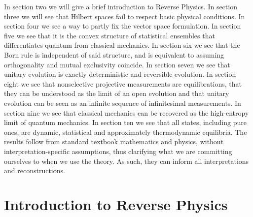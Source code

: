 \documentclass[entropy,article,submit,moreauthors]{Definitions/mdpi}
\begin{document}
In section two we will give a brief introduction to Reverse Physics. In section three we will see that Hilbert spaces fail to respect basic physical conditions. In section four we see a way to partly fix the vector space formulation. In section five we see that it is the convex structure of statistical ensembles that differentiates quantum from classical mechanics. In section six we see that the Born rule is independent of said structure, and is equivalent to assuming orthogonality and mutual exclusivity coincide. In section seven we see that unitary evolution is exactly deterministic and reversible evolution. In section eight we see that nonselective projective measurements are equilibrations, that they can be understood as the limit of an open evolution and that unitary evolution can be seen as an infinite sequence of infinitesimal measurements. In section nine we see that classical mechanics can be recovered as the high-entropy limit of quantum mechanics. In section ten we see that all states, including pure ones, are dynamic, statistical and approximately thermodynamic equilibria. The results follow from standard textbook mathematics and physics, without interpretation-specific assumptions, thus clarifying what we are committing ourselves to when we use the theory. As such, they can inform all interpretations and reconstructions.

\section{Introduction to Reverse Physics}
\end{document}

